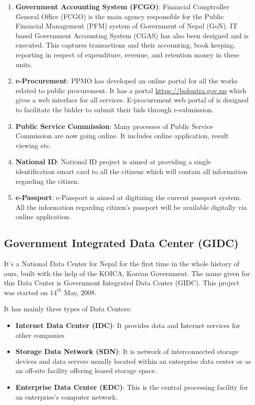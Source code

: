 \begin{enumerate}
	 \item \textbf{Government Accounting System (FCGO)}: Financial Comptroller General Office (FCGO) is the main agency responsible for the Public Financial Management (PFM) system of Government of Nepal (GoN). IT based Government Accounting System (CGAS) has also been designed and is executed. This captures transactions and their accounting, book keeping, reporting in respect of expenditure, revenue, and retention money in these units. 
	 
	 \item \textbf{e-Procurement}: 
	  PPMO has developed an online portal for all the works related to public procurement. It has a portal \url{https://bolpatra.gov.np} which gives a web interface for all services. E-procurement web portal of is designed to facilitate the bidder to submit their bids through e-submission. 
	  
	  \item \textbf{Public Service Commission}: 
	  Many processes of Public Service Commission are now going online. It includes online application, result viewing etc. 
	  
	  \item \textbf{National ID}:
	  National ID project is aimed at providing a single identification smart card to all the citizens which will contain all information regarding the citizen. 
	  
	  \item \textbf{e-Passport}: e-Passport is aimed at digitizing the current passport system. All the information regarding citizen's passport will be available digitally via online application. 
\end{enumerate}



\subsection{Government Integrated Data Center (GIDC)}
It's a National Data Center for Nepal for the first time in the whole history of ours, built with the help
of the KOICA, Korean Government. The name given for this Data Center is Government Integrated
Data Center (GIDC). This project was started on $ 14^{th} $ May, 2008.


It has mainly three types of Data Centers:
\begin{itemize}
	\item \textbf{Internet Data Center (IDC)}: It provides data and Internet services for other companies 
	\item \textbf{Storage Data Network (SDN)}: It is network of interconnected storage devices and data servers usually located within an
	enterprise data center or as an off-site facility offering leased storage space.
	\item \textbf{Enterprise Data Center (EDC)}: This is the central processing facility for an enterprise's computer network.
\end{itemize}


